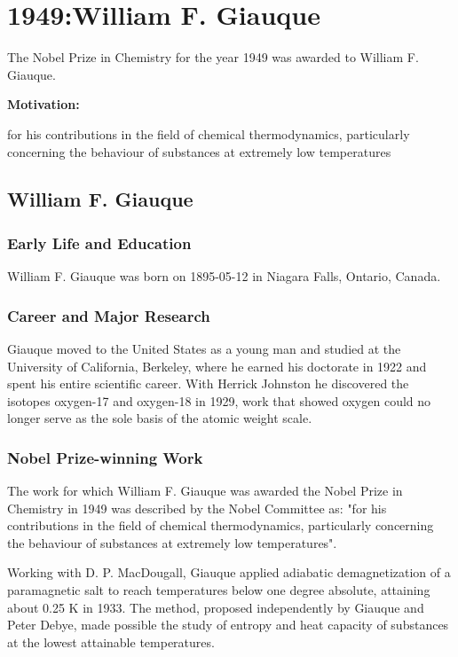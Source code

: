 \chapter{1949:William F. Giauque}

\label{chap:chemistry1949}

The Nobel Prize in Chemistry for the year 1949 was awarded to William F. Giauque.

\textbf{Motivation:}

for his contributions in the field of chemical thermodynamics, particularly concerning the behaviour of substances at extremely low temperatures

\section{William F. Giauque}

\subsection*{Early Life and Education}

William F. Giauque was born on 1895-05-12 in Niagara Falls, Ontario, Canada.

\subsection*{Career and Major Research}

Giauque moved to the United States as a young man and studied at the University of California, Berkeley, where he earned his doctorate in 1922 and spent his entire scientific career. With Herrick Johnston he discovered the isotopes oxygen-17 and oxygen-18 in 1929, work that showed oxygen could no longer serve as the sole basis of the atomic weight scale.

\subsection*{Nobel Prize-winning Work}

The work for which William F. Giauque was awarded the Nobel Prize in Chemistry in 1949 was described by the Nobel Committee as: "for his contributions in the field of chemical thermodynamics, particularly concerning the behaviour of substances at extremely low temperatures".

Working with D. P. MacDougall, Giauque applied adiabatic demagnetization of a paramagnetic salt to reach temperatures below one degree absolute, attaining about 0.25 K in 1933. The method, proposed independently by Giauque and Peter Debye, made possible the study of entropy and heat capacity of substances at the lowest attainable temperatures.


